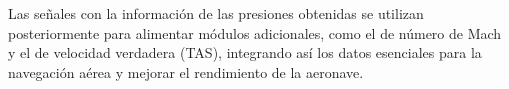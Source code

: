 Las señales con la información de las presiones obtenidas se utilizan posteriormente para alimentar módulos adicionales, como el de número de Mach y el de velocidad verdadera (TAS), integrando así los datos esenciales para la navegación aérea y mejorar el rendimiento de la aeronave.






















































